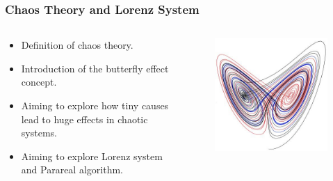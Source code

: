 \documentclass[
	11pt,
]{beamer}
\begin{document}
\begin{frame}
    \frametitle{Chaos Theory and Lorenz System}
	\begin{columns}[c]
		\begin{column}{0.65\textwidth} 
			\begin{itemize}
				\item Definition of chaos theory.
				\item Introduction of the butterfly effect concept.
				\item Aiming to explore how tiny causes lead to huge effects in chaotic systems.
				\item Aiming to explore Lorenz system and Parareal algorithm.
			\end{itemize}
		\end{column}
		\begin{column}{0.35\textwidth}
			\begin{figure}
				\includegraphics[width=1\linewidth]{butterfly.jpg}
			\end{figure}
		\end{column}
	\end{columns}

\end{frame}

\end{document}
